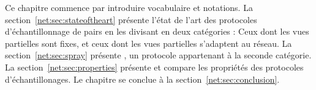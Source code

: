 
Ce chapitre commence par introduire vocabulaire et notations. La
section~\ref{net:sec:stateoftheart} présente l'état de l'art des protocoles
d'échantillonnage de pairs en les divisant en deux catégories : Ceux dont les
vues partielles sont fixes, et ceux dont les vues partielles s'adaptent au
réseau. La section~\ref{net:sec:spray} présente \SPRAY, un protocole appartenant
à la seconde catégorie. La section~\ref{net:sec:properties} présente et compare
les propriétés des protocoles d'échantillonages. Le chapitre se conclue à la
section~\ref{net:sec:conclusion}.


